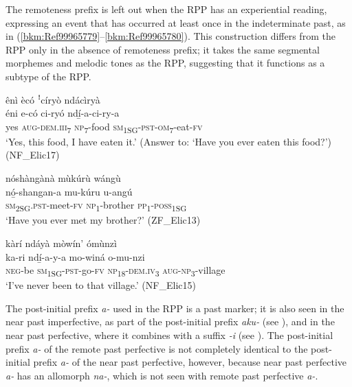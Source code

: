The remoteness prefix is left out when the RPP has an experiential reading, expressing an event that has occurred at least once in the indeterminate past, as in (\ref{bkm:Ref99965779}--\ref{bkm:Ref99965780}). This construction differs from the RPP only in the absence of remoteness prefix; it takes the same segmental morphemes and melodic tones as the RPP, suggesting that it functions as a subtype of the RPP.

\ea
\label{bkm:Ref99965779}
ênì ècó ꜝcíryò ndácìryà\\
\gll éni  e-có    ci-ryó    ndí̲-a-ci-ry-a\\
yes  \textsc{aug}-\textsc{dem}.\textsc{iii}\textsubscript{7}  \textsc{np}\textsubscript{7}-food  \textsc{sm}\textsubscript{1SG}-\textsc{pst}-\textsc{om}\textsubscript{7}-eat-\textsc{fv}\\
\glt ‘Yes, this food, I have eaten it.' (Answer to: ‘Have you ever eaten this food?’) (NF\_Elic17)
\z

\ea
nóshàngànà mùkúrù wángù\\
\gll nó̲-shangan-a  mu-kúru  u-angú\\
\textsc{sm}\textsubscript{2SG}.\textsc{pst}-meet-\textsc{fv}  \textsc{np}\textsubscript{1}-brother  \textsc{pp}\textsubscript{1}-\textsc{poss}\textsubscript{1SG}\\
\glt ‘Have you ever met my brother?’ (ZF\_Elic13)
\z

\ea
\label{bkm:Ref99965780}
kàrí ndáyà mòwín’ ómùnzì\\
\gll ka-ri    ndí̲-a-y-a    mo-winá  o-mu-nzi\\
\textsc{neg}-be  \textsc{sm}\textsubscript{1SG}-\textsc{pst}-go-\textsc{fv}  \textsc{np}\textsubscript{18}-\textsc{dem}.\textsc{iv}\textsubscript{3}  \textsc{aug}-\textsc{np}\textsubscript{3}-village\\
\glt ‘I’ve never been to that village.’ (NF\_Elic15)
\z

The post-initial prefix \textit{a-} used in the RPP is a past marker; it is also seen in the near past imperfective, as part of the post-initial prefix \textit{aku-} (see ), and in the near past perfective, where it combines with a suffix \textit{-i} (see ). The post-initial prefix \textit{a-} of the remote past perfective is not completely identical to the post-initial prefix \textit{a-} of the near past perfective, however, because near past perfective \textit{a-} has an allomorph \textit{na-}, which is not seen with remote past perfective \textit{a-}.

